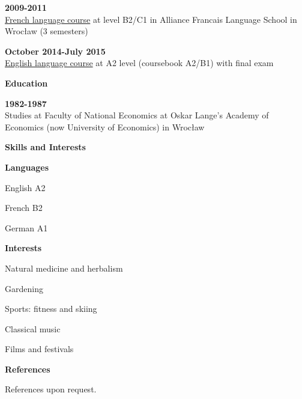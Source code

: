\documentclass[a4paper,12pt,final]{memoir}
\newcommand{\Sep}{\vspace{1.5em}}
\newcommand{\SmallSep}{\vspace{0.5em}}
\newenvironment{Career Profile}
	{\ignorespaces\textbf{\color{ForestGreen} Career Profile}}
	{\Sep\ignorespacesafterend}
\newenvironment{Key experience}
	{\ignorespaces\textbf{\color{ForestGreen} Key experience}}
	{\Sep\ignorespacesafterend}
\newcommand{\CVSection}[1]
	{\Large\textbf{#1}\par
	\SmallSep\normalsize\normalfont}
\newcommand{\CVItem}[1]
	{\textbf{\color{ForestGreen} #1}}
\begin{document}
\CVItem{2009-2011}\\
\underline{French language course} at level B2/C1 in Alliance Francais Language School in Wrocław (3 semesters)
\SmallSep

\CVItem{October 2014-July 2015}\\
\underline{English language course} at A2 level (coursebook A2/B1)
with final exam
\SmallSep

\CVSection{Education}
\CVItem{1982-1987}\\
Studies at Faculty of National Economics at Oskar Lange's Academy of Economics (now University of Economics) in Wrocław
\SmallSep


\CVSection{Skills and Interests}
\CVItem{Languages}
\begin{multicols}{3}
\begin{compactitem}[\color{ForestGreen}$\circ$]
	\item English A2
	\item French  B2
	\item German  A1
\end{compactitem}
\end{multicols}
\SmallSep

\CVItem{Interests}
\begin{multicols}{3}
\begin{compactitem}[\color{ForestGreen}$\circ$]
	\item Natural medicine and herbalism
	\item Gardening
	\item Sports: fitness and skiing 
	\item Classical music 
	\item Films and  festivals
\end{compactitem}
\end{multicols}
\Sep 

\CVSection{References}
References upon request.

\end{document}
